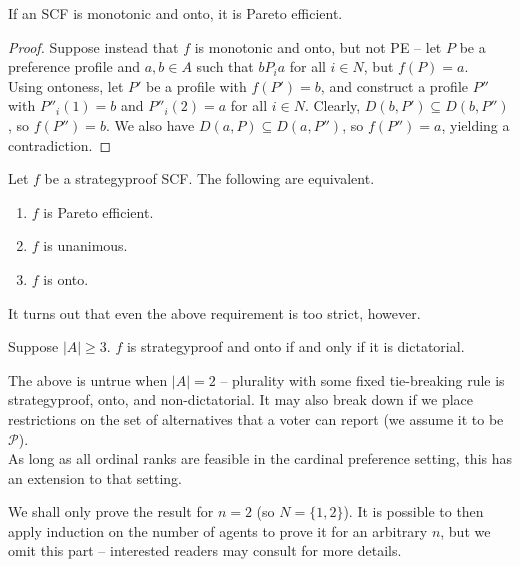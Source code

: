	\begin{flem}
		If an SCF is monotonic and onto, it is Pareto efficient.
	\end{flem}
	\begin{proof}
		Suppose instead that $f$ is monotonic and onto, but not PE -- let $P$ be a preference profile and $a,b \in A$ such that $b P_i a$ for all $i \in N$, but $f(P) = a$.\\
		Using ontoness, let $P'$ be a profile with $f(P') = b$, and construct a profile $P''$ with $P''_i(1) = b$ and $P''_i(2) = a$ for all $i \in N$. Clearly, $D(b,P') \subseteq D(b,P'')$, so $f(P'') = b$. We also have $D(a,P) \subseteq D(a,P'')$, so $f(P'') = a$, yielding a contradiction.
	\end{proof}

	\begin{fcor}
		Let $f$ be a strategyproof SCF. The following are equivalent.
		\begin{enumerate}
			\item $f$ is Pareto efficient.
			\item $f$ is unanimous.
			\item $f$ is onto.
		\end{enumerate}
	\end{fcor}

	It turns out that even the above requirement is too strict, however.

	\begin{ftheo}
		\label{theo: GS}
		Suppose $|A| \ge 3$. $f$ is strategyproof and onto if and only if it is dictatorial.
	\end{ftheo}
	The above is untrue when $|A| = 2$ -- plurality with some fixed tie-breaking rule is strategyproof, onto, and non-dictatorial. It may also break down if we place restrictions on the set of alternatives that a voter can report (we assume it to be $\mathcal{P}$).\\
	As long as all ordinal ranks are feasible in the cardinal preference setting, this has an extension to that setting.

	We shall only prove the result for $n = 2$ (so $N = \{1,2\}$). It is possible to then apply induction on the number of agents to prove it for an arbitrary $n$, but we omit this part -- interested readers may consult \cite{gs-theo-sen} for more details.

